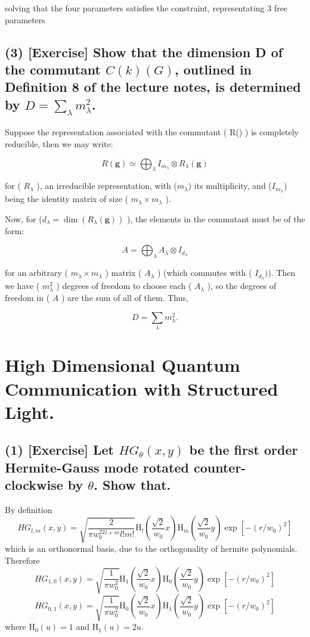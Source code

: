 \documentclass[12pt]{article}
\begin{document}
\begin{flushleft}
solving that the four parameters satisfies the constraint, representating 3 free parameters



\subsection*{(3) [Exercise] Show that the dimension D of the commutant $C(k)(G)$, outlined in Definition 8 of the lecture notes, is determined by $D = \sum_\lambda m_\lambda^2$.}

Suppose the representation associated with the commutant ( R() ) is completely reducible, then we may write:

\[
R(\mathbf{g}) \simeq \bigoplus_\lambda I_{m_\lambda} \otimes R_\lambda(\mathbf{g})
\]

for ( $R_\lambda$ ), an irreducible representation, with ($m_\lambda$) its multiplicity, and ($ I_{m_\lambda} $) being the identity matrix of size ( $m_\lambda \times m_\lambda$ ).

Now, for ($d_\lambda = \dim(R_\lambda(\mathbf{g}))$ ), the elements in the commutant must be of the form:

\[
A = \bigoplus_\lambda A_\lambda \otimes I_{d_\lambda}
\]

for an arbitrary ( $m_\lambda \times m_\lambda$ ) matrix ( $A_\lambda$ ) (which commutes with ( $I_{d_\lambda} )$). Then we have ( $m_\lambda^2$ ) degrees of freedom to choose each ( $A_\lambda$ ), so the degrees of freedom in ( $A$ ) are the sum of all of them. Thus,

\[
D = \sum_\lambda m_\lambda^2.
\]

\section*{High Dimensional Quantum Communication with Structured
Light.}

\subsection*{(1) [Exercise] Let $HG_\theta(x, y)$ be the first order Hermite-Gauss mode rotated counter-
clockwise by $\theta$. Show that.}

By definition
\[
    HG_{l,m}(x, y) = \sqrt{\frac{2}{\pi w_0^22^{l + m}l!m!}}\mathrm{H}_l(\frac{\sqrt{2}}{w_0}x)\mathrm{H}_m(\frac{\sqrt{2}}{w_0}y)\exp\left[-(r / w_0) ^ 2\right]
\]
which is an orthonormal basis, due to the orthogonality of hermite polynomials. Therefore
\[
    HG_{1,0}(x, y) = \sqrt{\frac{1}{\pi w_0^2}}\mathrm{H}_1(\frac{\sqrt{2}}{w_0}x)\mathrm{H}_0(\frac{\sqrt{2}}{w_0}y)\exp\left[-(r / w_0) ^ 2\right]
\]
\[
    HG_{0,1}(x, y) = \sqrt{\frac{1}{\pi w_0^2}}\mathrm{H}_0(\frac{\sqrt{2}}{w_0}x)\mathrm{H}_1(\frac{\sqrt{2}}{w_0}y)\exp\left[-(r / w_0) ^ 2\right]
\]
where $\mathrm{H}_0(u) = 1$ and $\mathrm{H}_1(u) = 2u$.


\end{flushleft}
\end{document}
